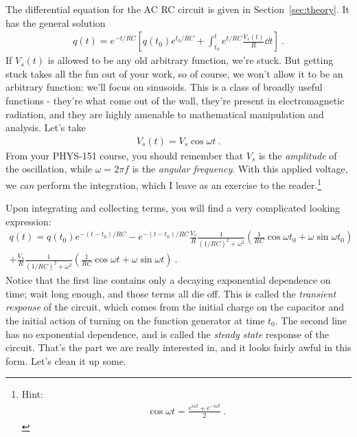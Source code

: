 \documentclass[12pt]{article}
\begin{document}
The differential equation for the AC RC circuit is given in
Section~\ref{sec:theory}.  It has the general solution
\begin{gather*}
  q(t) = e^{-t/RC} \left[ 
    q(t_0) e^{t_0/RC} + \int_{t_0}^t e^{t/RC} \frac{V_s(t)}{R} \dd t
\right]\ .
\end{gather*}
If $V_s(t)$ is allowed to be any old arbitrary function, we're stuck.
But getting stuck takes all the fun out of your work, so of course, we
won't allow it to be an arbitrary function: we'll focus on sinusoids.
This is a class of broadly useful functions - they're what come out of
the wall, they're present in electromagnetic radiation, and they are
highly amenable to mathematical manipulation and analysis.  Let's take 
\begin{gather*}
  V_s(t) = V_s \cos \omega t\ .
\end{gather*}
From your PHYS-151 course, you should remember that $V_s$ is the
\textit{amplitude} of the oscillation, while $\omega = 2 \pi f$ is the
\textit{angular frequency}.  With this applied voltage, we
\textit{can} perform the integration, which I leave as an exercise to
the reader.\footnote{Hint:
  \begin{gather*}
    \cos \omega t = \frac{e^{i\omega t} + e^{-i\omega t}}{2}\ .
  \end{gather*}
}

Upon integrating and collecting terms, you will find a very
complicated looking expression:
\begin{multline*}
  q(t) = q(t_0) e^{-(t-t_0)/RC} 
  - e^{-(t-t_0)/RC} \frac{V_s}{R} \frac{1}{(1/RC)^2 + \omega^2} 
  \left( \frac{1}{RC} \cos \omega t_0 + \omega \sin \omega t_0 \right) \\
  + \frac{V_s}{R} \frac{1}{(1/RC)^2 + \omega^2} 
  \left( \frac{1}{RC} \cos \omega t + \omega \sin \omega t \right)\ .
\end{multline*}
Notice that the first line contains only a decaying exponential
dependence on time; wait long enough, and those terms all die off.
This is called the \textit{transient response} of the circuit, which
comes from the initial charge on the capacitor and the initial action
of turning on the function generator at time $t_0$.  The second line
has no exponential dependence, and is called the \textit{steady state}
response of the circuit.  That's the part we are really interested in,
and it looks fairly awful in this form.  Let's clean it up some.
\end{document}
